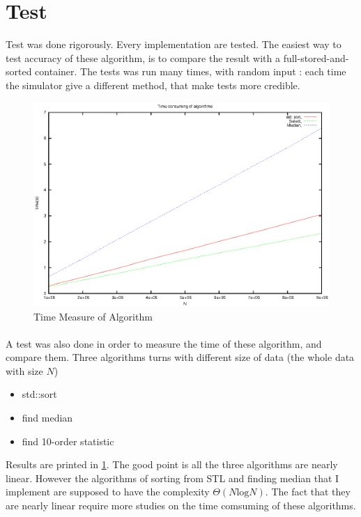 \documentclass[a4paper,10pt]{article}
\begin{document}
\section{Test}
Test was done rigorously. Every implementation are tested. The easiest way to test accuracy of these algorithm, is to compare the result with a full-stored-and-sorted container. The tests was run many times, with random input : each time the simulator give a different method, that make tests more credible.
\begin {figure}[h]
\begin{center}
\includegraphics[scale=1.0]{output_time_measure}
\caption{\label{fig:time_measure}Time Measure of Algorithm}
\end{center}
\end {figure}
\paragraph{} A test was also done in order to measure the time of these algorithm, and compare them. Three algorithms turns with different size of data (the whole data with size $N$)
\begin{itemize}
 \item std::sort
 \item find median
 \item find 10-order statistic
\end{itemize}
Results are printed in \ref{fig:time_measure}. The good point is all the three algorithms are nearly linear. However the algorithms of sorting from STL and finding median that I implement are supposed to have the complexity $\Theta(N\text{log}N)$. The fact that they are nearly linear require more studies on the time comsuming of these algorithms.


\end{document}
